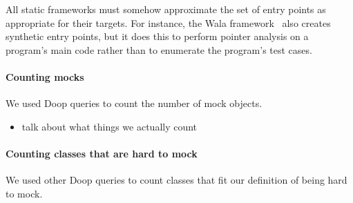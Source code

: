 All static frameworks must somehow approximate the set of entry points as appropriate for their targets. For instance, the Wala framework~\cite{wala19:_t} also creates synthetic entry points, but it does this to perform pointer analysis on a program's main code rather than to enumerate the program's test cases.

\paragraph{Counting mocks}
We used Doop queries to count the number of mock objects.
\begin{itemize}
\item talk about what things we actually count
\end{itemize}

\paragraph{Counting classes that are hard to mock}

We used other Doop queries to count classes that fit our definition of being hard to mock.







